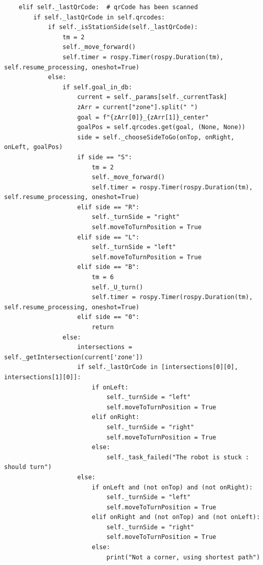 \documentclass[a4paper,12pt]{extreport}
\begin{document}
\begin{verbatim}
    elif self._lastQrCode:  # qrCode has been scanned
        if self._lastQrCode in self.qrcodes:  
            if self._isStationSide(self._lastQrCode):
                tm = 2
                self._move_forward()        
                self.timer = rospy.Timer(rospy.Duration(tm), self.resume_processing, oneshot=True)
            else:
                if self.goal_in_db:
                    current = self._params[self._currentTask]
                    zArr = current["zone"].split(" ")
                    goal = f"{zArr[0]}_{zArr[1]}_center"
                    goalPos = self.qrcodes.get(goal, (None, None))
                    side = self._chooseSideToGo(onTop, onRight, onLeft, goalPos)
                    if side == "S":
                        tm = 2
                        self._move_forward()        
                        self.timer = rospy.Timer(rospy.Duration(tm), self.resume_processing, oneshot=True)
                    elif side == "R":
                        self._turnSide = "right"
                        self.moveToTurnPosition = True
                    elif side == "L":
                        self._turnSide = "left"
                        self.moveToTurnPosition = True
                    elif side == "B":
                        tm = 6
                        self._U_turn()         
                        self.timer = rospy.Timer(rospy.Duration(tm), self.resume_processing, oneshot=True)
                    elif side == "0":
                        return
                else:  
                    intersections = self._getIntersection(current['zone']) 
                    if self._lastQrCode in [intersections[0][0], intersections[1][0]]: 
                        if onLeft:                  
                            self._turnSide = "left"
                            self.moveToTurnPosition = True
                        elif onRight:
                            self._turnSide = "right"
                            self.moveToTurnPosition = True
                        else: 
                            self._task_failed("The robot is stuck : should turn") 
                    else: 
                        if onLeft and (not onTop) and (not onRight):
                            self._turnSide = "left"
                            self.moveToTurnPosition = True
                        elif onRight and (not onTop) and (not onLeft): 
                            self._turnSide = "right"
                            self.moveToTurnPosition = True
                        else: 
                            print("Not a corner, using shortest path")

\end{verbatim}
\end{document}
